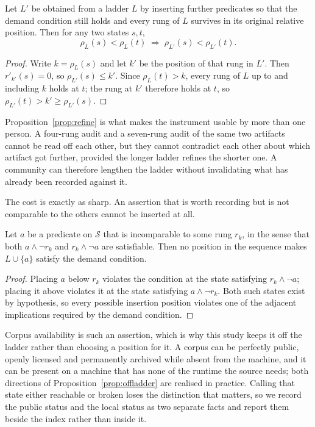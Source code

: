 \begin{proposition}\label{prop:refine}
Let $L'$ be obtained from a ladder $L$ by inserting further predicates so that
the demand condition still holds and every rung of $L$ survives in its original
relative position. Then for any two states $s, t$,
\[
  \rho_L(s) < \rho_L(t) \;\Longrightarrow\; \rho_{L'}(s) < \rho_{L'}(t).
\]
\end{proposition}

\begin{proof}
Write $k = \rho_L(s)$ and let $k'$ be the position of that rung in $L'$. Then
$r'_{k'}(s) = 0$, so $\rho_{L'}(s) \le k'$. Since $\rho_L(t) > k$, every rung of
$L$ up to and including $k$ holds at $t$; the rung at $k'$ therefore holds at
$t$, so $\rho_{L'}(t) > k' \ge \rho_{L'}(s)$.
\end{proof}

Proposition~\ref{prop:refine} is what makes the instrument usable by more than
one person. A four-rung audit and a seven-rung audit of the same two artifacts
cannot be read off each other, but they cannot contradict each other about which
artifact got further, provided the longer ladder refines the shorter one. A
community can therefore lengthen the ladder without invalidating what has
already been recorded against it.

The cost is exactly as sharp. An assertion that is worth recording but is not
comparable to the others cannot be inserted at all.

\begin{proposition}\label{prop:offladder}
Let $a$ be a predicate on $\mathcal{S}$ that is incomparable to some rung $r_k$,
in the sense that both $a \wedge \neg r_k$ and $r_k \wedge \neg a$ are satisfiable.
Then no position in the sequence makes $L \cup \{a\}$ satisfy the demand
condition.
\end{proposition}

\begin{proof}
Placing $a$ below $r_k$ violates the condition at the state satisfying
$r_k \wedge \neg a$; placing it above violates it at the state satisfying
$a \wedge \neg r_k$. Both such states exist by hypothesis, so every possible
insertion position violates one of the adjacent implications required by the
demand condition.
\end{proof}

Corpus availability is such an assertion, which is why this study keeps it off
the ladder rather than choosing a position for it. A corpus can be perfectly
public, openly licensed and permanently archived while absent from the machine,
and it can be present on a machine that has none of the runtime the source
needs; both directions of Proposition~\ref{prop:offladder} are realised in
practice. Calling that state either reachable or broken loses the distinction
that matters, so we record the public status and the local status as two
separate facts and report them beside the index rather than inside it.


